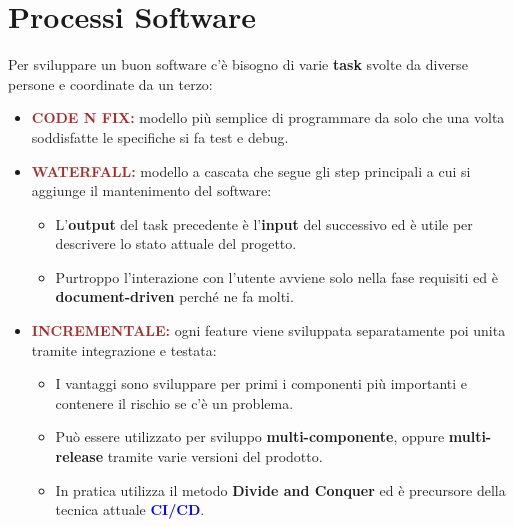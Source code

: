 \section{Processi Software}
Per sviluppare un buon software c'è bisogno di varie \textbf{task} svolte da diverse persone e coordinate da un terzo:
\begin{itemize}
    \item \textbf{\textcolor{brown}{CODE N FIX:}} modello più semplice di programmare da solo che una volta soddisfatte le specifiche si fa test e debug.
    \item \textbf{\textcolor{brown}{WATERFALL:}} modello a cascata che segue gli step principali a cui si aggiunge il mantenimento del software:
    \begin{itemize}
        \item L'\textbf{output} del task precedente è l'\textbf{input} del successivo ed è utile per descrivere lo stato attuale del progetto.
        \item Purtroppo l'interazione con l'utente avviene solo nella fase requisiti ed è \textbf{document-driven} perché ne fa molti.
    \end{itemize}
    \item \textbf{\textcolor{brown}{INCREMENTALE:}} ogni feature viene sviluppata separatamente poi unita tramite integrazione e testata:
    \begin{itemize}
        \item I vantaggi sono sviluppare per primi i componenti più importanti e contenere il rischio se c'è un problema.
        \item Può essere utilizzato per sviluppo \textbf{multi-componente}, oppure \textbf{multi-release} tramite varie versioni del prodotto.
        \item In pratica utilizza il metodo \textbf{Divide and Conquer} ed è precursore della tecnica attuale \textbf{\textcolor{blue}{CI/CD}}.
    \end{itemize}
\end{itemize}

